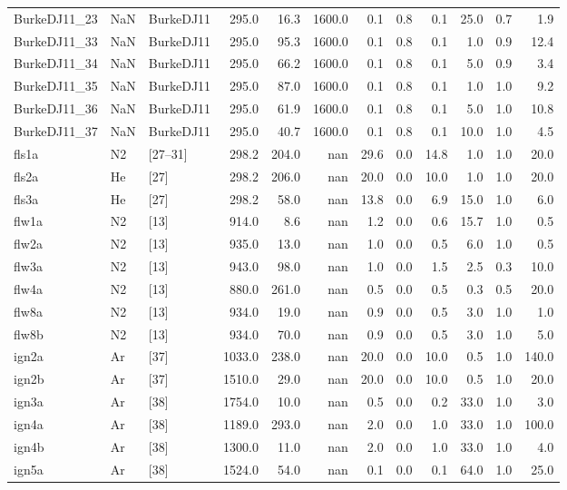 \begin{tabular}{lllrrrrrrrrr}
BurkeDJ11\_23  &  NaN &   BurkeDJ11 &  295.0 &    16.3 & 1600.0 &  0.1 &  0.8 &  0.1 & 25.0 &  0.7 &    1.9 \\
BurkeDJ11\_33  &  NaN &   BurkeDJ11 &  295.0 &    95.3 & 1600.0 &  0.1 &  0.8 &  0.1 &  1.0 &  0.9 &   12.4 \\
BurkeDJ11\_34  &  NaN &   BurkeDJ11 &  295.0 &    66.2 & 1600.0 &  0.1 &  0.8 &  0.1 &  5.0 &  0.9 &    3.4 \\
BurkeDJ11\_35  &  NaN &   BurkeDJ11 &  295.0 &    87.0 & 1600.0 &  0.1 &  0.8 &  0.1 &  1.0 &  1.0 &    9.2 \\
BurkeDJ11\_36  &  NaN &   BurkeDJ11 &  295.0 &    61.9 & 1600.0 &  0.1 &  0.8 &  0.1 &  5.0 &  1.0 &   10.8 \\
BurkeDJ11\_37  &  NaN &   BurkeDJ11 &  295.0 &    40.7 & 1600.0 &  0.1 &  0.8 &  0.1 & 10.0 &  1.0 &    4.5 \\
fls1a         &   N2 &     [27–31] &  298.2 &   204.0 &    nan & 29.6 &  0.0 & 14.8 &  1.0 &  1.0 &   20.0 \\
fls2a         &   He &        [27] &  298.2 &   206.0 &    nan & 20.0 &  0.0 & 10.0 &  1.0 &  1.0 &   20.0 \\
fls3a         &   He &        [27] &  298.2 &    58.0 &    nan & 13.8 &  0.0 &  6.9 & 15.0 &  1.0 &    6.0 \\
flw1a         &   N2 &        [13] &  914.0 &     8.6 &    nan &  1.2 &  0.0 &  0.6 & 15.7 &  1.0 &    0.5 \\
flw2a         &   N2 &        [13] &  935.0 &    13.0 &    nan &  1.0 &  0.0 &  0.5 &  6.0 &  1.0 &    0.5 \\
flw3a         &   N2 &        [13] &  943.0 &    98.0 &    nan &  1.0 &  0.0 &  1.5 &  2.5 &  0.3 &   10.0 \\
flw4a         &   N2 &        [13] &  880.0 &   261.0 &    nan &  0.5 &  0.0 &  0.5 &  0.3 &  0.5 &   20.0 \\
flw8a         &   N2 &        [13] &  934.0 &    19.0 &    nan &  0.9 &  0.0 &  0.5 &  3.0 &  1.0 &    1.0 \\
flw8b         &   N2 &        [13] &  934.0 &    70.0 &    nan &  0.9 &  0.0 &  0.5 &  3.0 &  1.0 &    5.0 \\
ign2a         &   Ar &        [37] & 1033.0 &   238.0 &    nan & 20.0 &  0.0 & 10.0 &  0.5 &  1.0 &  140.0 \\
ign2b         &   Ar &        [37] & 1510.0 &    29.0 &    nan & 20.0 &  0.0 & 10.0 &  0.5 &  1.0 &   20.0 \\
ign3a         &   Ar &        [38] & 1754.0 &    10.0 &    nan &  0.5 &  0.0 &  0.2 & 33.0 &  1.0 &    3.0 \\
ign4a         &   Ar &        [38] & 1189.0 &   293.0 &    nan &  2.0 &  0.0 &  1.0 & 33.0 &  1.0 &  100.0 \\
ign4b         &   Ar &        [38] & 1300.0 &    11.0 &    nan &  2.0 &  0.0 &  1.0 & 33.0 &  1.0 &    4.0 \\
ign5a         &   Ar &        [38] & 1524.0 &    54.0 &    nan &  0.1 &  0.0 &  0.1 & 64.0 &  1.0 &   25.0 \\
\bottomrule
\end{tabular}
